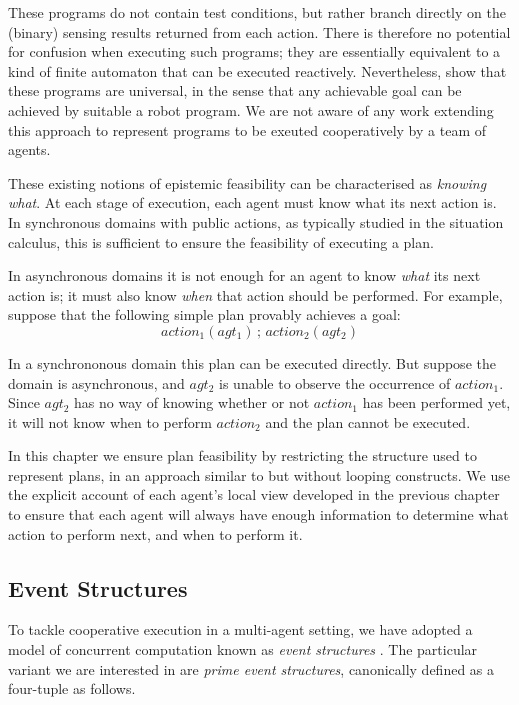These programs do not contain test conditions, but rather branch directly
on the (binary) sensing results returned from each action. There is
therefore no potential for confusion when executing such programs;
they are essentially equivalent to a kind of finite automaton that
can be executed reactively. Nevertheless, \citet{levesque98what_robots_can_do}
show that these programs are universal, in the sense that any achievable
goal can be achieved by suitable a robot program. We are not aware
of any work extending this approach to represent programs to be exeuted
cooperatively by a team of agents.

These existing notions of epistemic feasibility can be characterised
as \emph{knowing what}. At each stage of execution, each agent must
know what its next action is. In synchronous domains with public actions,
as typically studied in the situation calculus, this is sufficient
to ensure the feasibility of executing a plan.

In asynchronous domains it is not enough for an agent to know \emph{what}
its next action is; it must also know \emph{when} that action should
be performed. For example, suppose that the following simple plan
provably achieves a goal:\[
action_{1}(agt_{1})\,;\, action_{2}(agt_{2})\]


In a synchrononous domain this plan can be executed directly. But
suppose the domain is asynchronous, and $agt_{2}$ is unable to observe
the occurrence of $action_{1}$. Since $agt_{2}$ has no way of knowing
whether or not $action_{1}$ has been performed yet, it will not know
when to perform $action_{2}$ and the plan cannot be executed.

In this chapter we ensure plan feasibility by restricting the structure
used to represent plans, in an approach similar to \citep{levesque98what_robots_can_do}
but without looping constructs. We use the explicit account of each
agent's local view developed in the previous chapter to ensure that
each agent will always have enough information to determine what action
to perform next, and when to perform it.


\subsection{Event Structures}

To tackle cooperative execution in a multi-agent setting, we have
adopted a model of concurrent computation known as \emph{event structures}
\citep{npw79event_structures}. The particular variant we are interested
in are \emph{prime event structures}, canonically defined as a four-tuple
as follows.

